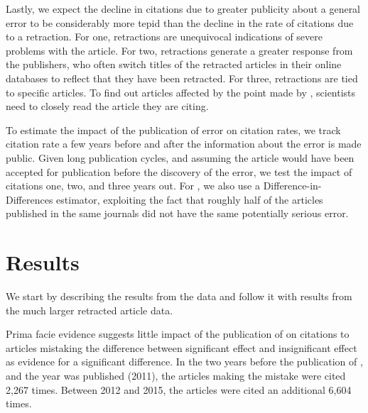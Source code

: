 \documentclass[12pt, letterpaper]{article}
\begin{document}
Lastly, we expect the decline in citations due to greater publicity about a general error to be considerably more tepid than the decline in the rate of citations due to a retraction. For one, retractions are unequivocal indications of severe problems with the article. For two, retractions generate a greater response from the publishers, who often switch titles of the retracted articles in their online databases to reflect that they have been retracted. For three, retractions are tied to specific articles. To find out articles affected by the point made by \citet{nieuwenhuis2011}, scientists need to closely read the article they are citing. 

To estimate the impact of the publication of error on citation rates, we track citation rate a few years before and after the information about the error is made public. Given long publication cycles, and assuming the article would have been accepted for publication before the discovery of the error, we test the impact of citations one, two, and three years out. For \citet{nieuwenhuis2011}, we also use a Difference-in-Differences estimator, exploiting the fact that roughly half of the articles published in the same journals did not have the same potentially serious error.

\section*{Results}
We start by describing the results from the \citet{nieuwenhuis2011} data and follow it with results from the much larger retracted article data.

Prima facie evidence suggests little impact of the publication of \citet{nieuwenhuis2011} on citations to articles mistaking the difference between significant effect and insignificant effect as evidence for a significant difference. In the two years before the publication of \citet{nieuwenhuis2011}, and the year \citet{nieuwenhuis2011} was published (2011), the articles making the mistake were cited 2,267 times. Between 2012 and 2015, the articles were cited an additional 6,604 times.
\end{document}
